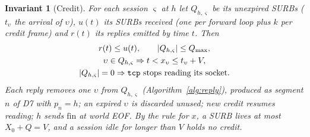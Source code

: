 \documentclass[journal]{IEEEtran}
\newtheorem{invariant}{Invariant}
\newcommand{\sid}{\varsigma}
\DeclareRobustCommand{\code}[1]{{\ttfamily\renewcommand{\_}{\textunderscore\allowbreak}#1}}
\begin{document}
\begin{invariant}[Credit]\label{inv:credit}
For each session $\sid$ at $h$ let $Q_{h,\sid}$ be its unexpired SURBs
($t_\upsilon$ the arrival of $\upsilon$), $u(t)$ its SURBs received (one
per forward loop plus $k$ per credit frame) and $r(t)$ its replies emitted
by time $t$.  Then
\begin{gather*}
r(t)\le u(t),\qquad |Q_{h,\sid}|\le Q_{\max},\\
\upsilon\in Q_{h,\sid}\Rightarrow t<x_\upsilon\le t_\upsilon+V,\\
|Q_{h,\sid}|=0\Rightarrow\text{\code{tcp} stops reading its socket.}
\end{gather*}
Each reply removes one $\upsilon$ from $Q_{h,\sid}$
(Algorithm~\ref{alg:reply}), produced as segment $n$ of D7 with
$p_n=h$; an expired $\upsilon$ is discarded unused; new credit resumes
reading; $h$ sends $\mathrm{fin}$ at world EOF.  By the rule for $x$, a SURB lives at most $X_0+Q=V$,
and a session idle for longer than $V$ holds no credit.
\end{invariant}
\end{document}
